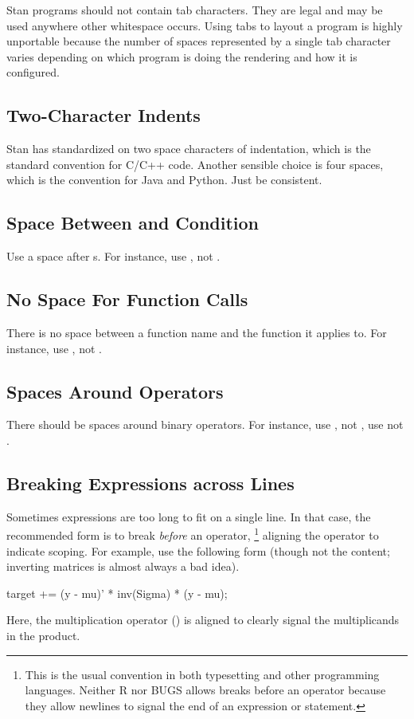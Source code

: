 Stan programs should not contain tab characters.  They are legal and
may be used anywhere other whitespace occurs.  Using tabs to layout a
program is highly unportable because the number of spaces
represented by a single tab character varies depending on which
program is doing the rendering and how it is configured.

\subsection{Two-Character Indents}

Stan has standardized on two space characters of indentation, which is
the standard convention for C/C++ code.  Another sensible choice is
four spaces, which is the convention for Java and Python.  Just be
consistent.

\subsection{Space Between  and Condition}

Use a space after s.  For instance, use , not
.

\subsection{No Space For Function Calls}

There is no space between a function name and the function it applies
to.  For instance, use , not .

\subsection{Spaces Around Operators}

There should be spaces around binary operators.  For instance, use
, not , use  not
.

\subsection{Breaking Expressions across Lines}

Sometimes expressions are too long to fit on a single line.  In that
case, the recommended form is to break \emph{before} an operator,%
%
\footnote{This is the usual convention in both typesetting and other
  programming languages. Neither R nor BUGS allows breaks before an
  operator because they allow newlines to signal the end of an
  expression or statement.}
%
aligning the operator to indicate scoping.  For example, use the
following form (though not the content; inverting matrices is almost
always a bad idea).
%
\begin{stancode}
target += (y - mu)' * inv(Sigma) * (y - mu);
\end{stancode}
%
Here, the multiplication operator (\code{*}) is aligned to clearly
signal the multiplicands in the product.

